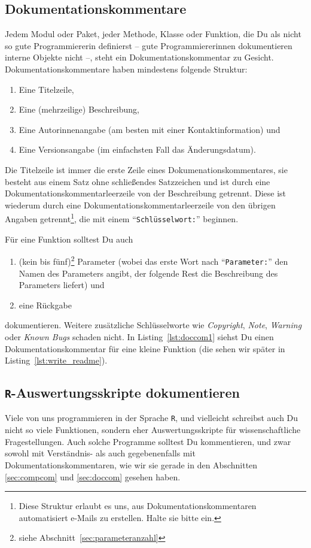 \documentclass[twoside]{scrreprt}
\providecommand{\R}{\texttt{R}}
\providecommand{\code}[1]{\texttt{#1}}
\begin{document}
\subsection{Dokumentationskommentare\label{sec:doccom}}
Jedem Modul oder Paket, jeder Methode, Klasse oder Funktion, die Du als nicht so
gute Programmiererin definierst -- gute Programmiererinnen dokumentieren interne
Objekte nicht --, steht ein Dokumentationskommentar zu Gesicht.
Dokumentationskommentare haben mindestens
folgende Struktur:
\begin{enumerate}
    \item Eine Titelzeile,
    \item Eine (mehrzeilige) Beschreibung,
    \item Eine Autorinnenangabe (am besten mit einer Kontaktinformation) und
    \item Eine Versionsangabe (im einfachsten Fall das \"A{}nderungsdatum).
\end{enumerate}
Die Titelzeile ist immer die erste Zeile eines Dokumenationskommentares, sie
besteht aus einem Satz ohne schlie\ss{}endes Satzzeichen und ist durch eine
Dokumentationskommentarleerzeile von der Beschreibung getrennt. Diese ist
wiederum durch eine Dokumentationskommentarleerzeile von den \"u{}brigen Angaben
getrennt\footnote{
    Diese Struktur erlaubt es uns, aus Dokumentationskommentaren automatisiert
    e-Mails zu erstellen. Halte sie bitte ein.
}, die mit einem "`\code{Schl\"u{}sselwort:}"' beginnen.

F\"u{}r eine Funktion solltest Du auch
\begin{enumerate}[resume]
    \item (kein bis f\"u{}nf)\footnote{siehe
	    Abschnitt~\ref{sec:parameteranzahl}} Parameter (wobei das erste Wort
	    nach "`\code{Parameter:}"' den Namen des Parameters angibt, der
	    folgende Rest die Beschreibung des Parameters liefert) und
    \item eine R\"u{}ckgabe
\end{enumerate}
dokumentieren. Weitere zus\"a{}tzliche Schl\"u{}sselworte wie
\emph{Copyright}, \emph{Note}, \emph{Warning} oder \emph{Known Bugs}
schaden nicht.
In Listing~\ref{lst:doccom1} siehst Du einen Dokumentationskommentar
f\"u{}r eine kleine Funktion (die sehen wir sp\"a{}ter in
Listing~\ref{lst:write_readme}).


\subsection{\R{}-Auswertungsskripte dokumentieren
\label{sec:rdoc}
}
Viele von uns programmieren in der Sprache \R{}, und vielleicht schreibst
auch Du nicht so viele Funktionen, sondern eher Auswertungsskripte f\"u{}r
wissenschaftliche Fragestellungen.
Auch solche Programme solltest Du kommentieren, und zwar sowohl mit
Verst\"a{}ndnis- als auch gegebenenfalls mit  Dokumentationskommentaren, wie wir
sie gerade in den Abschnitten \ref{sec:compcom} und \ref{sec:doccom} gesehen
haben.
\end{document}
